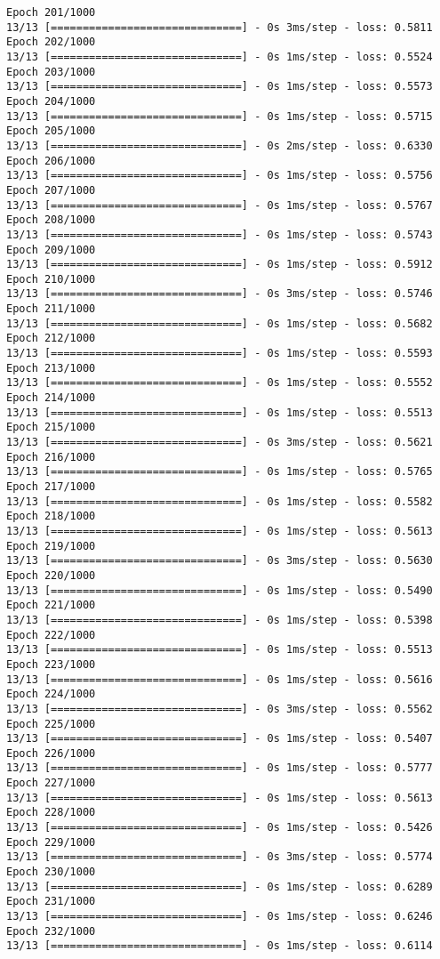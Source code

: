 \documentclass[11pt]{article}
\begin{document}
\begin{Verbatim}[commandchars=\\\{\}]
Epoch 201/1000
13/13 [==============================] - 0s 3ms/step - loss: 0.5811
Epoch 202/1000
13/13 [==============================] - 0s 1ms/step - loss: 0.5524
Epoch 203/1000
13/13 [==============================] - 0s 1ms/step - loss: 0.5573
Epoch 204/1000
13/13 [==============================] - 0s 1ms/step - loss: 0.5715
Epoch 205/1000
13/13 [==============================] - 0s 2ms/step - loss: 0.6330
Epoch 206/1000
13/13 [==============================] - 0s 1ms/step - loss: 0.5756
Epoch 207/1000
13/13 [==============================] - 0s 1ms/step - loss: 0.5767
Epoch 208/1000
13/13 [==============================] - 0s 1ms/step - loss: 0.5743
Epoch 209/1000
13/13 [==============================] - 0s 1ms/step - loss: 0.5912
Epoch 210/1000
13/13 [==============================] - 0s 3ms/step - loss: 0.5746
Epoch 211/1000
13/13 [==============================] - 0s 1ms/step - loss: 0.5682
Epoch 212/1000
13/13 [==============================] - 0s 1ms/step - loss: 0.5593
Epoch 213/1000
13/13 [==============================] - 0s 1ms/step - loss: 0.5552
Epoch 214/1000
13/13 [==============================] - 0s 1ms/step - loss: 0.5513
Epoch 215/1000
13/13 [==============================] - 0s 3ms/step - loss: 0.5621
Epoch 216/1000
13/13 [==============================] - 0s 1ms/step - loss: 0.5765
Epoch 217/1000
13/13 [==============================] - 0s 1ms/step - loss: 0.5582
Epoch 218/1000
13/13 [==============================] - 0s 1ms/step - loss: 0.5613
Epoch 219/1000
13/13 [==============================] - 0s 3ms/step - loss: 0.5630
Epoch 220/1000
13/13 [==============================] - 0s 1ms/step - loss: 0.5490
Epoch 221/1000
13/13 [==============================] - 0s 1ms/step - loss: 0.5398
Epoch 222/1000
13/13 [==============================] - 0s 1ms/step - loss: 0.5513
Epoch 223/1000
13/13 [==============================] - 0s 1ms/step - loss: 0.5616
Epoch 224/1000
13/13 [==============================] - 0s 3ms/step - loss: 0.5562
Epoch 225/1000
13/13 [==============================] - 0s 1ms/step - loss: 0.5407
Epoch 226/1000
13/13 [==============================] - 0s 1ms/step - loss: 0.5777
Epoch 227/1000
13/13 [==============================] - 0s 1ms/step - loss: 0.5613
Epoch 228/1000
13/13 [==============================] - 0s 1ms/step - loss: 0.5426
Epoch 229/1000
13/13 [==============================] - 0s 3ms/step - loss: 0.5774
Epoch 230/1000
13/13 [==============================] - 0s 1ms/step - loss: 0.6289
Epoch 231/1000
13/13 [==============================] - 0s 1ms/step - loss: 0.6246
Epoch 232/1000
13/13 [==============================] - 0s 1ms/step - loss: 0.6114

\end{Verbatim}
\end{document}
